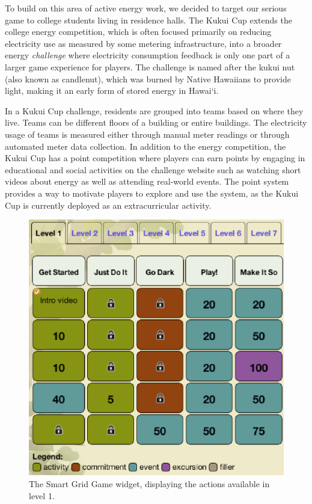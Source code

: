 \documentclass{sigchi}
\newcommand{\Hawaii}{Hawai`i\xspace}
\begin{document}
To build on this area of active energy work, we decided to target our serious game to college students living in residence halls. The Kukui Cup extends the college energy competition, which is often focused primarily on reducing electricity use as measured by some metering infrastructure, into a broader energy \emph{challenge} where electricity consumption feedback is only one part of a larger game experience for players. The challenge is named after the kukui nut (also known as candlenut), which was burned by Native Hawaiians to provide light, making it an early form of stored energy in \Hawaii.

In a Kukui Cup challenge, residents are grouped into teams based on where they live. Teams can be different floors of a building or entire buildings. The electricity usage of teams is measured either through manual meter readings or through automated meter data collection. In addition to the energy competition, the Kukui Cup has a point competition where players can earn points by engaging in educational and social activities on the challenge website such as watching short videos about energy as well as attending real-world events. The point system provides a way to motivate players to explore and use the system, as the Kukui Cup is currently deployed as an extracurricular activity.

\begin{figure}[!t]
\centering
\includegraphics[width=0.95\columnwidth]{smart-grid.eps}
\caption{The Smart Grid Game widget, displaying the actions available in level 1.}
\label{fig:smart-grid}
\end{figure}
\end{document}
